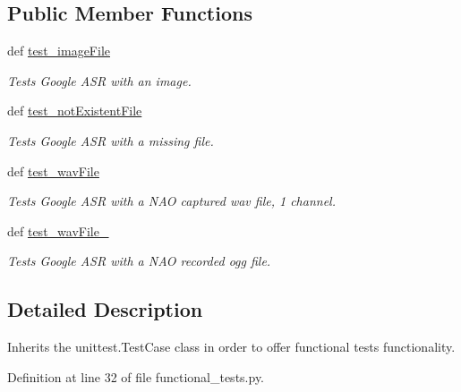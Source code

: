 \subsection*{Public Member Functions}
\begin{DoxyCompactItemize}
\item 
def \hyperlink{classfunctional__tests_1_1SpeechToTextFunc_ab33701bb946c7e8c80d8a5b6e7c4abfc}{test\-\_\-image\-File}
\begin{DoxyCompactList}\small\item\em Tests Google A\-S\-R with an image. \end{DoxyCompactList}\item 
def \hyperlink{classfunctional__tests_1_1SpeechToTextFunc_ae5fda4eac95917536723e8134b50a353}{test\-\_\-not\-Existent\-File}
\begin{DoxyCompactList}\small\item\em Tests Google A\-S\-R with a missing file. \end{DoxyCompactList}\item 
def \hyperlink{classfunctional__tests_1_1SpeechToTextFunc_a1038ecffd4b8c2d0ceb9626aedefe2c9}{test\-\_\-wav\-File}
\begin{DoxyCompactList}\small\item\em Tests Google A\-S\-R with a N\-A\-O captured wav file, 1 channel. \end{DoxyCompactList}\item 
def \hyperlink{classfunctional__tests_1_1SpeechToTextFunc_a1c3e6cc84f1bf7ba8efc03f3f602a4f8}{test\-\_\-wav\-File\-\_}
\begin{DoxyCompactList}\small\item\em Tests Google A\-S\-R with a N\-A\-O recorded ogg file. \end{DoxyCompactList}\end{DoxyCompactItemize}


\subsection{Detailed Description}
Inherits the unittest.\-Test\-Case class in order to offer functional tests functionality. 

Definition at line 32 of file functional\-\_\-tests.\-py.



